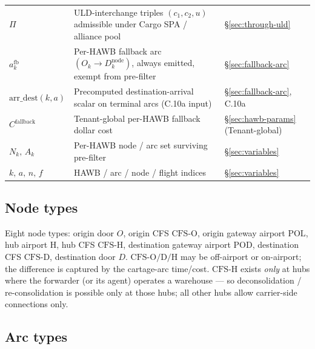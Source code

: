 \documentclass[11pt,a4paper]{article}
\theoremstyle{definition}
\begin{document}
\begin{table}[H]
\begin{tabular}{p{4.2cm}p{7.5cm}p{3cm}}
$\Pi$ & ULD-interchange triples $(c_1, c_2, u)$ admissible under Cargo SPA / alliance pool & \S\ref{sec:through-uld} \\
$a^{\text{fb}}_k$ & Per-HAWB fallback arc $(O_k \to D_k^{\text{node}})$, always emitted, exempt from pre-filter & \S\ref{sec:fallback-arc} \\
$\text{arr\_dest}(k, a)$ & Precomputed destination-arrival scalar on terminal arcs (C.10a input) & \S\ref{sec:fallback-arc}, C.10a \\
$C^{\text{fallback}}$ & Tenant-global per-HAWB fallback dollar cost & \S\ref{sec:hawb-params} (Tenant-global) \\
$N_k,\, A_k$ & Per-HAWB node / arc set surviving pre-filter & \S\ref{sec:variables} \\
$k,\, a,\, n,\, f$ & HAWB / arc / node / flight indices & \S\ref{sec:variables} \\
\bottomrule
\end{tabular}
\end{table}

\subsection{Node types}

Eight node types: origin door \(O\), origin CFS \(\text{CFS-O}\), origin
gateway airport \(\text{POL}\), hub airport \(\text{H}\), hub CFS
\(\text{CFS-H}\), destination gateway airport \(\text{POD}\), destination CFS
\(\text{CFS-D}\), destination door \(D\). \(\text{CFS-O/D/H}\) may be
off-airport or on-airport; the difference is captured by the cartage-arc
time/cost. \(\text{CFS-H}\) exists \emph{only} at hubs where the forwarder (or
its agent) operates a warehouse --- so deconsolidation / re-consolidation is
possible only at those hubs; all other hubs allow carrier-side connections
only.

\subsection{Arc types}
\end{document}
